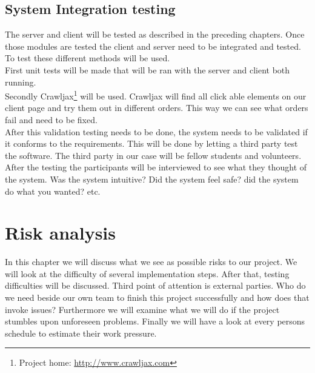 \documentclass[a4paper]{article}
\begin{document}



\subsection{System Integration testing}
The server and client will be tested as described in the preceding chapters. Once those modules are tested the client and server need to be integrated and tested. To test these different methods will be used.\\
First unit tests will be made that will be ran with the server and client both running.\\
Secondly Crawljax\footnote{ Project home: \url{http://www.crawljax.com}} will be used. Crawljax will find all click able elements on our client page and try them out in different orders. This way we can see what orders fail and need to be fixed.\\



After this validation testing needs to be done, the system needs to be validated if it conforms to the requirements. This will be done by letting a third party test the software. The third party in our case will be fellow students and volunteers. After the testing the participants will be interviewed to see what they thought of the system. Was the system intuitive? Did the system feel safe? did the system do what you wanted? etc.

\section{Risk analysis}
In this chapter we will discuss what we see as possible risks to our project. We will look at the difficulty of several implementation steps. After that, testing difficulties will be discussed. Third point of attention is external parties. Who do we need beside our own team to finish this project successfully and how does that invoke issues? Furthermore we will examine what we will do if the project stumbles upon unforeseen problems. Finally we will have a look at every persons schedule to estimate their work pressure.
\end{document}
